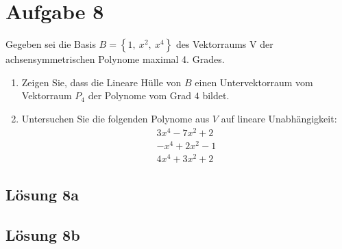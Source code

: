 \documentclass[main.tex]{subfiles}
\begin{document}
\section{Aufgabe 8}
Gegeben sei die Basis $B=\left\{1,\ x^{2} ,\ x^{4}\right\}$ des Vektorraums V der achsensymmetrischen Polynome maximal 4. Grades. 

\begin{enumerate}
    \item Zeigen Sie, dass die Lineare Hülle von $B$ einen Untervektorraum vom Vektorraum $P_{4}$ der Polynome vom Grad $4$ bildet.
    \item Untersuchen Sie die folgenden Polynome aus $V$ auf lineare Unabhängigkeit:
    \begin{gather*}
        3x^{4} -7x^{2} +2\\
        -x^{4} +2x^{2} -1\\
        4x^{4} +3x^{2} +2
    \end{gather*}    
\end{enumerate}

\subsection{Lösung 8a}

\subsection{Lösung 8b}
\end{document}

